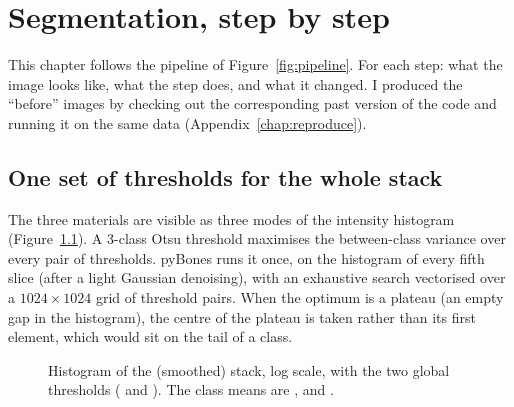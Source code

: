 \chapter{Segmentation, step by step}
\label{chap:segmentation}

This chapter follows the pipeline of Figure~\ref{fig:pipeline}. For each step: what the image
looks like, what the step does, and what it changed. I produced the ``before'' images by checking
out the corresponding past version of the code and running it on the same data
(Appendix~\ref{chap:reproduce}).

\section{One set of thresholds for the whole stack}
\label{sec:thresholds}

The three materials are visible as three modes of the intensity histogram
(Figure~\ref{fig:histogram}). A 3-class Otsu threshold maximises the between-class variance over every
pair of thresholds. pyBones runs it once, on the histogram of every fifth slice (after a light
Gaussian denoising), with an exhaustive search vectorised over a $1024 \times 1024$ grid of threshold
pairs. When the optimum is a plateau (an empty gap in the histogram), the centre of the plateau is
taken rather than its first element, which would sit on the tail of a class.

\begin{figure}[ht]
\centering
{}
\caption{Histogram of the (smoothed) stack, log scale, with the two global thresholds
  (\pbValueThrBone{} and \pbValueThrVessel). The class means are \pbValueMeanBackground,
  \pbValueMeanBone{} and \pbValueMeanVessel.}
\label{fig:histogram}
\end{figure}

